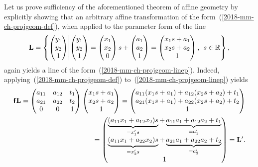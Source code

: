 {\color{OliveGreen}
\bproof
Let us prove sufficiency of the aforementioned theorem of affine geometry
by explicitly showing that an arbitrary affine transformation of the form~(\ref{2018-mm-ch-projgeom-def}),
when applied to the parameter form  of the line
\begin{equation}
{\bf L}= \left\{ \begin{pmatrix}
y_1\\ y_2\\1
\end{pmatrix}
\middle|
\begin{pmatrix}
y_1\\ y_2 \\1
\end{pmatrix}
=
\begin{pmatrix}
x_1\\ x_2  \\0
\end{pmatrix}
s
+
\begin{pmatrix}
a_1\\ a_2  \\1
\end{pmatrix}
=
\begin{pmatrix}
x_1 s + a_1\\
x_2 s + a_2 \\1
\end{pmatrix} \text{, }\;
s\in \mathbb{R}
\right\}
,
\label{2018-mm-ch-projgeom-linep}
\end{equation}
again yields a line of the form~(\ref{2018-mm-ch-projgeom-linep}).
Indeed, applying~(\ref{2018-mm-ch-projgeom-def}) to~(\ref{2018-mm-ch-projgeom-linep})
yields
\begin{equation}
\begin{split}
\textsf{\textbf{f}} {\bf L}
=
\begin{pmatrix}
a_{11}&a_{12}&{t}_1\\
a_{21}&a_{22}&{t}_2\\
0&0&1
\end{pmatrix}
\begin{pmatrix}
x_1 s + a_1\\
x_2 s + a_2 \\
1
\end{pmatrix}
=
\begin{pmatrix}
a_{11}(x_1s +a_1) +a_{12}(x_2s+a_2) +{t}_1\\
a_{21}(x_1s +a_1) +a_{22}(x_2s+a_2) +{t}_2\\
 1
\end{pmatrix}
\\
=
\begin{pmatrix}
\underbrace{(a_{11}x_1 +a_{12}x_2)s}_{=x_1's} + \underbrace{a_{11}a_1 +a_{12}a_2 +{t}_1}_{=a_1'}\\
\underbrace{(a_{11}x_1 +a_{22}x_2)s}_{=x_2's} + \underbrace{a_{21}a_1 +a_{22}a_2 +{t}_2}_{=a_2'}\\
 1
\end{pmatrix}  = {\bf L}'
.
\end{split}
\label{2018-mm-ch-projgeom-linepap}
\end{equation}

}
